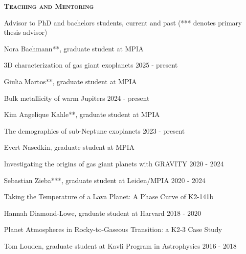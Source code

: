 \documentclass[12pt,letterpaper]{article}
\begin{document}
\vspace{7mm}
\textbf{\textsc{Teaching and Mentoring}} 
\begin{compactitem}[]
\item Advisor to PhD and bachelors students, current and past (*** denotes primary thesis advisor)
	\begin{compactitem}
        \item Nora Bachmann**, graduate student at MPIA \hfill  
		\begin{sloppypar}
	         3D characterization of gas giant exoplanets \hfill 2025 - present
		\end{sloppypar}
        \item Giulia Martos**, graduate student at MPIA \hfill  
		\begin{sloppypar}
	         Bulk metallicity of warm Jupiters \hfill 2024 - present
		\end{sloppypar}
        \item Kim Angelique Kahle**, graduate student at MPIA \hfill  
		\begin{sloppypar}
	         The demographics of sub-Neptune exoplanets \hfill 2023 - present
		\end{sloppypar}
        \item Evert Nasedkin, graduate student at MPIA \hfill 
		\begin{sloppypar}
	         Investigating the origins of gas giant planets with GRAVITY \hfill 2020 - 2024	
		\end{sloppypar}
        \item Sebastian Zieba***, graduate student at Leiden/MPIA \hfill 2020 - 2024
		\begin{sloppypar}
		Taking the Temperature of a Lava Planet: A Phase Curve of K2-141b
		\end{sloppypar}
        \item Hannah Diamond-Lowe, graduate student at Harvard \hfill 2018 - 2020
		\begin{sloppypar}
		Planet Atmospheres in Rocky-to-Gaseous Transition: a K2-3 Case Study
		\end{sloppypar}
	\item Tom Louden, graduate student at Kavli Program in Astrophysics \hfill 2016 - 2018

\end{compactitem}
\end{compactitem}
\end{document}
